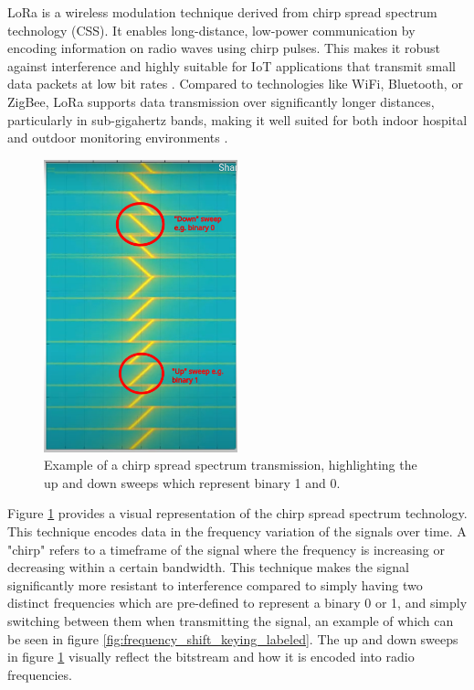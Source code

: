 LoRa is a wireless modulation technique derived from chirp spread spectrum technology (CSS). It enables long-distance, low-power communication by encoding information on radio waves using chirp pulses. This makes it robust against interference and highly suitable for IoT applications that transmit small data packets at low bit rates \cite{what_are_lora_lorawan}. Compared to technologies like WiFi, Bluetooth, or ZigBee, LoRa supports data transmission over significantly longer distances, particularly in sub-gigahertz bands, making it well suited for both indoor hospital and outdoor monitoring environments \cite{lora_documentation}.

\begin{figure}[H]
\centering
\includegraphics[width=0.5\textwidth]{images/chirp_spread_spectrum_labeled}
\caption{Example of a chirp spread spectrum transmission, highlighting the up and down sweeps which represent binary 1 and 0. \cite{Wenner2017-hd}}
\label{fig:chirp_spread_spectrum_labeled}
\end{figure}

Figure \ref{fig:chirp_spread_spectrum_labeled} provides a visual representation of the chirp spread spectrum technology. This technique encodes data in the frequency variation of the signals over time. A "chirp" refers to a timeframe of the signal where the frequency is increasing or decreasing within a certain bandwidth. This technique makes the signal significantly more resistant to interference compared to simply having two distinct frequencies which are pre-defined to represent a binary 0 or 1, and simply switching between them when transmitting the signal, an example of which can be seen in figure \ref{fig:frequency_shift_keying_labeled}. The up and down sweeps in figure \ref{fig:chirp_spread_spectrum_labeled} visually reflect the bitstream and how it is encoded into radio frequencies.

